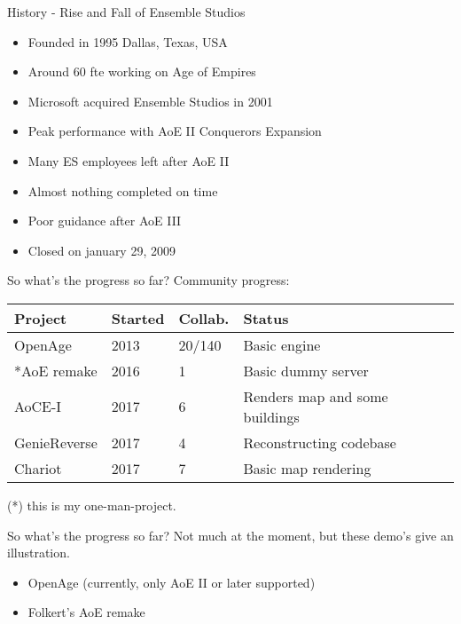 \documentclass{beamer}
\begin{document}
\begin{frame}{History - Rise and Fall of Ensemble Studios}
	\begin{itemize}
		\item Founded in 1995 Dallas, Texas, USA
		\item Around 60 fte working on Age of Empires
		\item Microsoft acquired Ensemble Studios in 2001
		\item Peak performance with AoE II Conquerors Expansion
		\item Many ES employees left after AoE II
		\item Almost nothing completed on time
		\item Poor guidance after AoE III
		\item Closed on january 29, 2009
	\end{itemize}
\end{frame}


\begin{frame}{So what's the progress so far?}
	Community progress:
	\begin{tabular}{l|l|l|l}
		Project & Started & Collab. & Status \\ \hline
		OpenAge & 2013 & 20/140 & Basic engine \\
		*AoE remake & 2016 & 1 & Basic dummy server \\
		AoCE-I & 2017 & 6 & Renders map and some buildings \\
		GenieReverse & 2017 & 4 & Reconstructing codebase \\
		Chariot & 2017 & 7 & Basic map rendering \\ %
	\end{tabular}
	(*) this is my one-man-project.

\end{frame}


\begin{frame}{So what's the progress so far?}
	Not much at the moment, but these demo's give an illustration.

	\begin{itemize}
		\item OpenAge (currently, only AoE II or later supported)
		\item Folkert's AoE remake
	\end{itemize}
\end{frame}
\end{document}
